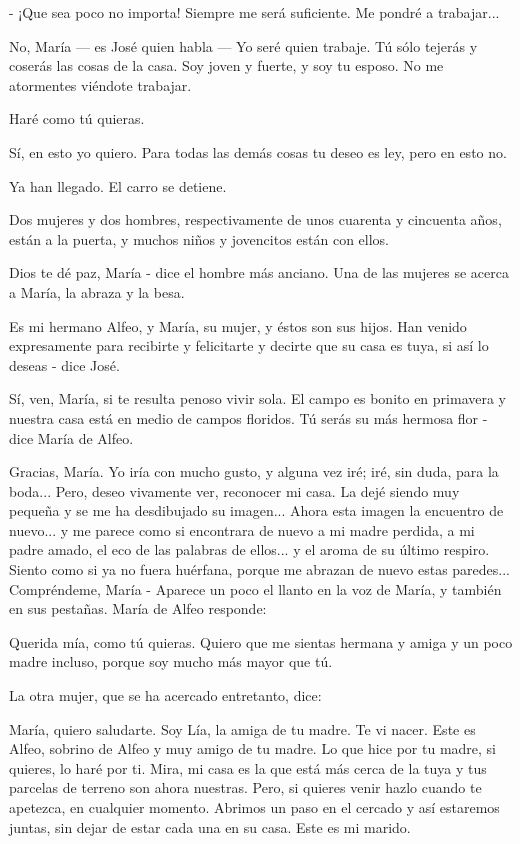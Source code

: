 \documentclass[12pt]{book} %
\begin{document}
- ¡Que sea poco no importa! Siempre me será suficiente. Me pondré a trabajar... 

No, María — es José quien habla — Yo seré quien trabaje. Tú sólo tejerás y coserás las cosas de la casa. Soy joven y fuerte, y soy tu esposo. No me atormentes viéndote trabajar. 

Haré como tú quieras. 

Sí, en esto yo quiero. Para todas las demás cosas tu deseo es ley, pero en esto no. 

Ya han llegado. El carro se detiene. 

Dos mujeres y dos hombres, respectivamente de unos cuarenta y cincuenta años, están a la puerta, y muchos niños y jovencitos están con ellos. 

Dios te dé paz, María - dice el hombre más anciano. Una de las mujeres se acerca a María, la abraza y la besa. 

Es mi hermano Alfeo, y María, su mujer, y éstos son sus hijos. Han venido expresamente para recibirte y felicitarte y decirte que su casa es tuya, si así lo deseas - dice José. 

Sí, ven, María, si te resulta penoso vivir sola. El campo es bonito en primavera y nuestra casa está en medio de campos floridos. Tú serás su más hermosa flor - dice María de Alfeo. 

Gracias, María. Yo iría con mucho gusto, y alguna vez iré; iré, sin duda, para la boda... Pero, deseo vivamente ver, reconocer mi casa. La dejé siendo muy pequeña y se me ha desdibujado su imagen... Ahora esta imagen la encuentro de nuevo... y me parece como si encontrara de nuevo a mi madre perdida, a mi padre amado, el eco de las palabras de ellos... y el aroma de su último respiro. Siento como si ya no fuera huérfana, porque me abrazan de nuevo estas paredes... Compréndeme, María - Aparece un poco el llanto en la voz de María, y también en sus pestañas. María de Alfeo responde: 

Querida mía, como tú quieras. Quiero que me sientas hermana y amiga y un poco madre incluso, porque soy mucho más mayor que tú. 

La otra mujer, que se ha acercado entretanto, dice: 

María, quiero saludarte. Soy Lía, la amiga de tu madre. Te vi nacer. Este es Alfeo, sobrino de Alfeo y muy amigo de tu madre. Lo que hice por tu madre, si quieres, lo haré por ti. Mira, mi casa es la que está más cerca de la tuya y tus parcelas de terreno son ahora nuestras. Pero, si quieres venir hazlo cuando te apetezca, en cualquier momento. Abrimos un paso en el cercado y así estaremos juntas, sin dejar de estar cada una en su casa. Este es mi marido. 
\end{document}
